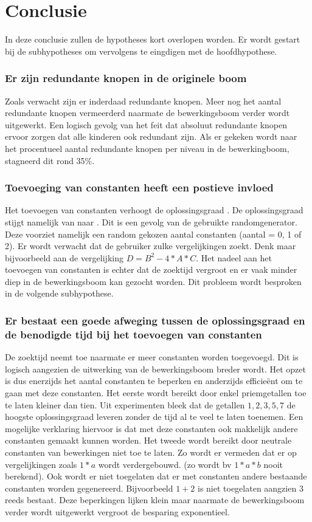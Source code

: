 \documentclass[Main.tex]{subfiles}
\begin{document}
\section{Conclusie}
In deze conclusie zullen de hypotheses kort overlopen worden. Er wordt gestart bij de subhypotheses om vervolgens te eingdigen met de hoofdhypothese.
\subsubsection{Er zijn redundante knopen in de originele boom}
Zoals verwacht zijn er inderdaad redundante knopen. Meer nog het aantal redundante knopen vermeerderd naarmate de bewerkingsboom verder wordt uitgewerkt. Een logisch gevolg van het feit dat absoluut redundante knopen ervoor zorgen dat alle kinderen ook redundant zijn. Als er gekeken wordt naar het procentueel aantal redundante knopen per niveau in de bewerkingboom, stagneerd dit rond 35\%.
\subsubsection{Toevoeging van constanten heeft een postieve invloed}
Het toevoegen van constanten verhoogt de oplossingsgraad %
. De oplossingsgraad stijgt namelijk van %
naar %
. Dit is een gevolg van de gebruikte randomgenerator. Deze voorziet namelijk een random gekozen aantal constanten (aantal = 0, 1 of 2). Er wordt verwacht dat de gebruiker zulke vergelijkingen zoekt. Denk maar bijvoorbeeld aan de vergelijking $D = B^{2} - 4 \ast A \ast C$. Het nadeel aan het toevoegen van constanten is echter dat de zoektijd vergroot en er vaak minder diep in de bewerkingsboom kan gezocht worden. Dit probleem wordt besproken in de volgende subhypothese.
\subsubsection{Er bestaat een goede afweging tussen de oplossingsgraad en de benodigde tijd bij het toevoegen van constanten}
De zoektijd neemt toe naarmate er meer constanten worden toegevoegd. Dit is logisch aangezien de uitwerking van de bewerkingsboom breder wordt. Het opzet is dus enerzijds het aantal constanten te beperken en anderzijds efficie\"ent om te gaan met deze constanten. Het eerste wordt bereikt door enkel priemgetallen toe te laten kleiner dan tien. Uit experimenten bleek dat de getallen $1, 2, 3, 5, 7$ de hoogste oplossingsgraad leveren zonder de tijd al te veel te laten toenemen. Een mogelijke verklaring hiervoor is dat met deze constanten ook makkelijk andere constanten gemaakt kunnen worden. Het tweede wordt bereikt door neutrale constanten van bewerkingen niet toe te laten. Zo wordt er vermeden dat er op vergelijkingen zoals $1*a$ wordt verdergebouwd. (zo wordt bv $1*a*b$ nooit berekend). Ook wordt er niet toegelaten dat er met constanten andere bestaande constanten worden gegenereerd. Bijvoorbeeld $1+2$ is niet toegelaten aangzien $3$ reeds bestaat. Deze beperkingen lijken klein maar naarmate de bewerkingsboom verder wordt uitgewerkt vergroot de besparing exponentieel. %
\end{document}
